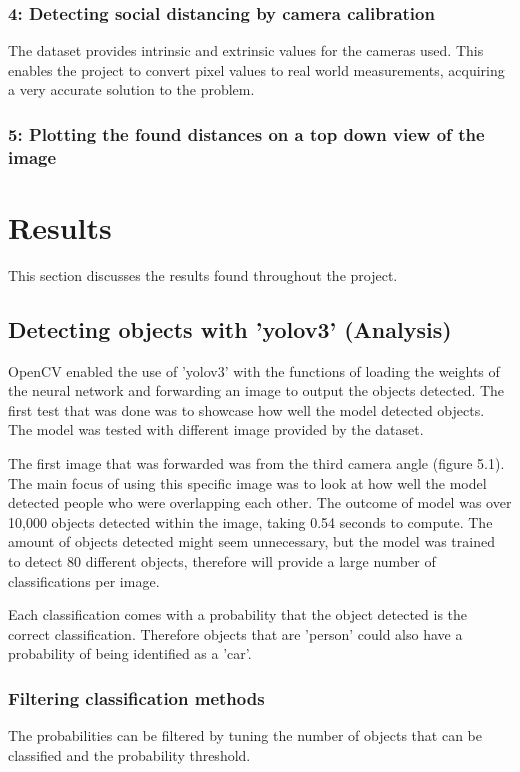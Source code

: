 \documentclass[12pt]{report}
\begin{document}
\subsection{4: Detecting social distancing by camera calibration}

The dataset provides intrinsic and extrinsic values for the cameras used. This enables the project to convert pixel values to real world measurements, acquiring a very accurate solution to the problem.

\subsection{5: Plotting the found distances on a top down view of the image}

\subsection{}

\chapter{Results}

This section discusses the results found throughout the project.

\section{Detecting objects with 'yolov3' (Analysis)}

OpenCV enabled the use of 'yolov3' with the functions of loading the weights of the neural network and forwarding an image to output the objects detected. The first test that was done was to showcase how well the model detected objects. The model was tested with different image provided by the dataset.

The first image that was forwarded was from the third camera angle (figure 5.1). The main focus of using this specific image was to look at how well the model detected people who were overlapping each other. The outcome of model was over 10,000 objects detected within the image, taking 0.54 seconds to compute. The amount of objects detected might seem unnecessary, but the model was trained to detect 80 different objects, therefore will provide a large number of classifications per image.

Each classification comes with a probability that the object detected is the correct classification. Therefore objects that are 'person' could also have a probability of being identified as a 'car'.

\subsection{Filtering classification methods}

The probabilities can be filtered by tuning the number of objects that can be classified and the probability threshold. 
\end{document}
